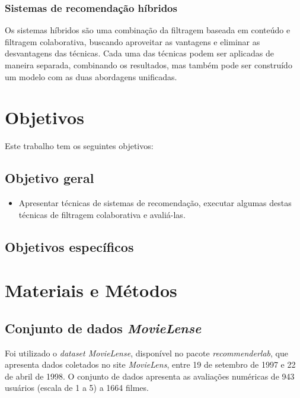 \documentclass[12pt,a4paper,header]{abnt}
\begin{document}
\subsection{Sistemas de recomendação híbridos}

Os sistemas híbridos são uma combinação da filtragem baseada em conteúdo e filtragem colaborativa, buscando aproveitar as vantagens e eliminar as desvantagens das técnicas\cite{shapira2011recommender}. Cada uma das técnicas podem ser aplicadas de maneira separada, combinando os resultados, mas também pode ser construído um modelo com as duas abordagens unificadas\cite{takahashi2015estudo}.

\chapter{Objetivos}

Este trabalho tem os seguintes objetivos:

\section{Objetivo geral}

\begin{itemize}

\item{Apresentar técnicas de sistemas de recomendação, executar algumas destas técnicas de filtragem colaborativa e avaliá-las.}

\end{itemize}

\section{Objetivos específicos}


\chapter{Materiais e Métodos}

\section{Conjunto de dados \textit{MovieLense}}

Foi utilizado o \textit{dataset MovieLense}, disponível no pacote \textit{recommenderlab}, que apresenta dados coletados no site \textit{MovieLens}, entre 19 de setembro de 1997 e 22 de abril de 1998. O conjunto de dados apresenta as avaliações numéricas de 943 usuários (escala de 1 a 5) a 1664 filmes\cite{recommenderlab}.
\end{document}

